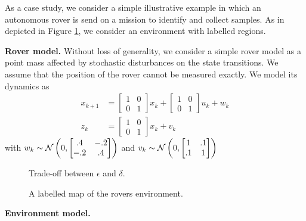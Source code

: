 As a case study, we consider a simple illustrative example in which an autonomous rover is send on a mission to identify and collect samples.
As in depicted in Figure \ref{fig:Scenario}, we consider an environment with labelled regions. 
 


\textbf{Rover model.} Without loss of generality, we consider a simple rover model as a point mass affected by stochastic disturbances on the state transitions. We assume that the position of the rover cannot be measured exactly. 
We model its dynamics as
\begin{align}
	x_{k+1}&=\begin{bmatrix}
		1&0\\
		0&1
	\end{bmatrix} x_{k} + \begin{bmatrix}
		1&0\\
		0&1
	\end{bmatrix} u_k+ w_k\\
z_k&=\begin{bmatrix}
		1&0\\
		0&1
	\end{bmatrix}x_k+v_k
\end{align}
with $w_k\sim \mathcal{N} \left(0,\begin{bmatrix}.4&-.2\\-.2&.4\end{bmatrix}\right)$ and $v_k\sim \mathcal{N} \left(0,\begin{bmatrix}1&.1\\.1&1\end{bmatrix}\right)$

\begin{figure}
	
	\caption{Trade-off between $\epsilon$ and $\delta$.  }
\end{figure}
\begin{figure}
	\caption{A labelled map of the rovers environment. }\label{fig:Scenario}
\end{figure}
\textbf{Environment model.} 



